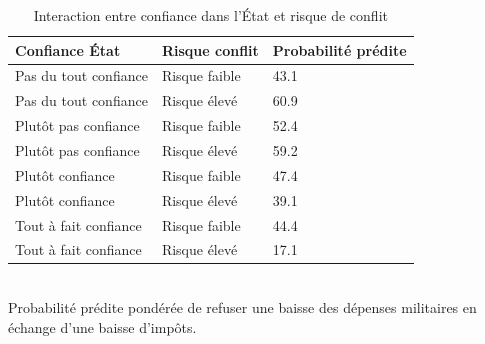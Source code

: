 \begin{table}[!t]
\centering
\caption{Interaction entre confiance dans l'État et risque de conflit}
\begin{tabular}{lll}
\toprule
Confiance État & Risque conflit & Probabilité prédite \\
\midrule
Pas du tout confiance & Risque faible & 43.1\\%
Pas du tout confiance & Risque élevé & 60.9\\%
Plutôt pas confiance & Risque faible & 52.4\\%
Plutôt pas confiance & Risque élevé & 59.2\\%
Plutôt confiance & Risque faible & 47.4\\%
Plutôt confiance & Risque élevé & 39.1\\%
Tout à fait confiance & Risque faible & 44.4\\%
Tout à fait confiance & Risque élevé & 17.1\\%
\bottomrule
\end{tabular}
\\ \footnotesize{Probabilité prédite pondérée de refuser une baisse des dépenses militaires en échange d'une baisse d'impôts.}
\end{table}
